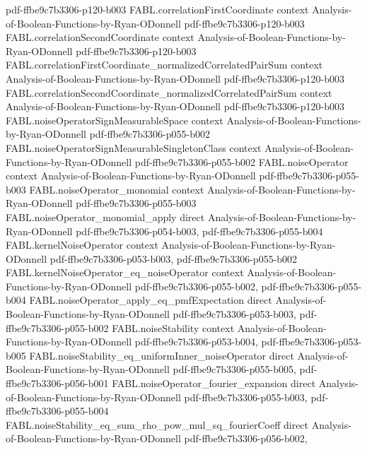 \begin{theorem}
  {pdf-ffbe9c7b3306-p120-b003}
\proofstep
  {FABL.correlationFirstCoordinate}
  {context}
  {Analysis-of-Boolean-Functions-by-Ryan-ODonnell}
  {pdf-ffbe9c7b3306-p120-b003}
\proofstep
  {FABL.correlationSecondCoordinate}
  {context}
  {Analysis-of-Boolean-Functions-by-Ryan-ODonnell}
  {pdf-ffbe9c7b3306-p120-b003}
\proofstep
  {FABL.correlationFirstCoordinate_normalizedCorrelatedPairSum}
  {context}
  {Analysis-of-Boolean-Functions-by-Ryan-ODonnell}
  {pdf-ffbe9c7b3306-p120-b003}
\proofstep
  {FABL.correlationSecondCoordinate_normalizedCorrelatedPairSum}
  {context}
  {Analysis-of-Boolean-Functions-by-Ryan-ODonnell}
  {pdf-ffbe9c7b3306-p120-b003}
\proofstep
  {FABL.noiseOperatorSignMeasurableSpace}
  {context}
  {Analysis-of-Boolean-Functions-by-Ryan-ODonnell}
  {pdf-ffbe9c7b3306-p055-b002}
\proofstep
  {FABL.noiseOperatorSignMeasurableSingletonClass}
  {context}
  {Analysis-of-Boolean-Functions-by-Ryan-ODonnell}
  {pdf-ffbe9c7b3306-p055-b002}
\proofstep
  {FABL.noiseOperator}
  {context}
  {Analysis-of-Boolean-Functions-by-Ryan-ODonnell}
  {pdf-ffbe9c7b3306-p055-b003}
\proofstep
  {FABL.noiseOperator_monomial}
  {context}
  {Analysis-of-Boolean-Functions-by-Ryan-ODonnell}
  {pdf-ffbe9c7b3306-p055-b003}
\proofstep
  {FABL.noiseOperator_monomial_apply}
  {direct}
  {Analysis-of-Boolean-Functions-by-Ryan-ODonnell}
  {pdf-ffbe9c7b3306-p054-b003,
    pdf-ffbe9c7b3306-p055-b004}
\proofstep
  {FABL.kernelNoiseOperator}
  {context}
  {Analysis-of-Boolean-Functions-by-Ryan-ODonnell}
  {pdf-ffbe9c7b3306-p053-b003,
    pdf-ffbe9c7b3306-p055-b002}
\proofstep
  {FABL.kernelNoiseOperator_eq_noiseOperator}
  {context}
  {Analysis-of-Boolean-Functions-by-Ryan-ODonnell}
  {pdf-ffbe9c7b3306-p055-b002,
    pdf-ffbe9c7b3306-p055-b004}
\proofstep
  {FABL.noiseOperator_apply_eq_pmfExpectation}
  {direct}
  {Analysis-of-Boolean-Functions-by-Ryan-ODonnell}
  {pdf-ffbe9c7b3306-p053-b003,
    pdf-ffbe9c7b3306-p055-b002}
\proofstep
  {FABL.noiseStability}
  {context}
  {Analysis-of-Boolean-Functions-by-Ryan-ODonnell}
  {pdf-ffbe9c7b3306-p053-b004,
    pdf-ffbe9c7b3306-p053-b005}
\proofstep
  {FABL.noiseStability_eq_uniformInner_noiseOperator}
  {direct}
  {Analysis-of-Boolean-Functions-by-Ryan-ODonnell}
  {pdf-ffbe9c7b3306-p055-b005,
    pdf-ffbe9c7b3306-p056-b001}
\proofstep
  {FABL.noiseOperator_fourier_expansion}
  {direct}
  {Analysis-of-Boolean-Functions-by-Ryan-ODonnell}
  {pdf-ffbe9c7b3306-p055-b003,
    pdf-ffbe9c7b3306-p055-b004}
\proofstep
  {FABL.noiseStability_eq_sum_rho_pow_mul_sq_fourierCoeff}
  {direct}
  {Analysis-of-Boolean-Functions-by-Ryan-ODonnell}
  {pdf-ffbe9c7b3306-p056-b002,
}
\end{theorem}
